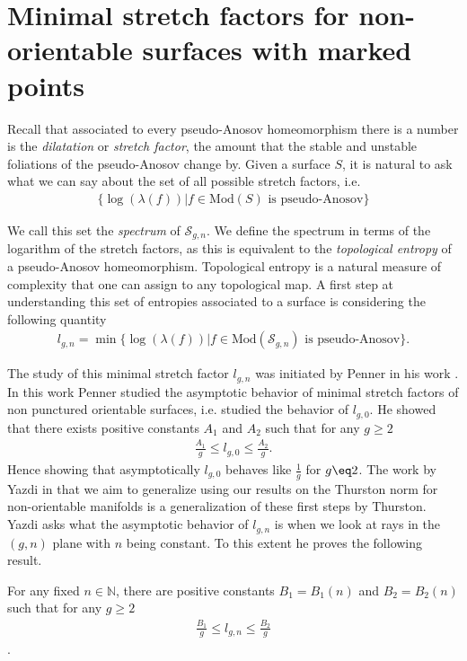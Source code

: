 \section{Minimal stretch factors for non-orientable surfaces with marked points}
\label{sec:application}

Recall that associated to every pseudo-Anosov homeomorphism there is a number is the \textit{dilatation} or \textit{stretch factor}, the amount that the stable and unstable foliations of the pseudo-Anosov change by. Given a surface $S$, it is natural to ask what we can say about the set of all possible stretch factors, i.e.
\begin{align*}
    \{\log(\lambda(f)) | f \in \text{Mod}(S) \text{ is pseudo-Anosov}\}
\end{align*}

We call this set the \textit{spectrum} of $\mathcal{S}_{g,n}$. We define the spectrum in terms of the logarithm of the stretch factors, as this is equivalent to the \textit{topological entropy} of a pseudo-Anosov homeomorphism. Topological entropy is a natural measure of complexity that one can assign to any topological map. A first step at understanding this set of entropies associated to a surface is considering the following quantity
\begin{align*}
    l_{g,n} =\min\{\log(\lambda(f)) | f \in \text{Mod}(\mathcal{S}_{g,n}) \text{ is pseudo-Anosov}\}.
\end{align*}

The study of this minimal stretch factor $l_{g,n}$ was initiated by Penner in his work \cite{penner1991bounds}. In this work Penner studied the asymptotic behavior of minimal stretch factors of non punctured orientable surfaces, i.e. studied the behavior of $l_{g,0}$. He showed that there exists positive constants $A_1$ and $A_2$ such that for any $g \geq 2$
\begin{align*}
    \frac{A_1}{g} \leq l_{g,0} \leq \frac{A_2}{g}.
\end{align*}
Hence showing that asymptotically $l_{g,0}$ behaves like $\frac{1}{g}$ for $g \eq 2$. The work by Yazdi in \cite{yazdi2018pseudo} that we aim to generalize using our results on the Thurston norm for non-orientable manifolds is a generalization of these first steps by Thurston. Yazdi asks what the asymptotic behavior of $l_{g,n}$ is when we look at rays in the $(g,n)$ plane with $n$ being constant. To this extent he proves the following result.                               

\begin{thm}[Yazdi]
\label{thm:yazdi1}
For any fixed $n \in \mathbb{N}$, there are positive constants $B_1 = B_1(n)$ and $B_2 = B_2(n)$ such that for any $g \geq 2$ 
\begin{align*}
    \frac{B_1}{g} \leq l_{g,n} \leq \frac{B_2}{g}
\end{align*}.
\end{thm}

